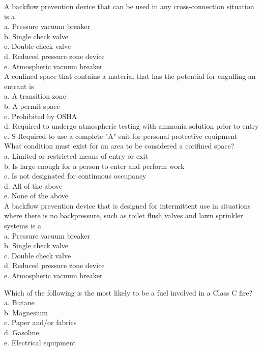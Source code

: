 A backflow prevention device that can be used in any cross-connection situation is a\\
a. Pressure vacuum breaker\\
b. Single check valve\\
c. Double check valve\\
d. Reduced pressure zone device\\
e. Atmospheric vacuum breaker\\

A confined space that contains a material that has the potential for engulfing an entrant is\\
a. A transition zone\\
b. A permit space\\
c. Prohibited by OSHA\\
d. Required to undergo atmospheric testing with ammonia solution prior to entry\\
e. S Required to use a complete "A" suit for personal protective equipment\\

What condition must exist for an area to be considered a corifined space?\\
a. Limited or restricted means of entry or exit\\
b. Is large enough for a person to enter and perform work\\
c. Is not designated for continuous occupancy\\
d. All of the above\\
e. None of the above\\

A backflow prevention device that is designed for intermittent use in situations where there is no backpressure, such as toilet flush valves and lawn sprinkler systems is a\\
a. Pressure vacuum breaker\\
b. Single check valve\\
c. Double check valve\\
d. Reduced pressure zone device\\
e. Atmospheric vacuum breaker 

Which of the following is the most likely to be a fuel involved in a Class $\mathrm{C}$ fire?\\
a. Butane\\
b. Magnesium\\
c. Paper and/or fabrics\\
d. Gasoline\\
e. Electrical equipment\\

